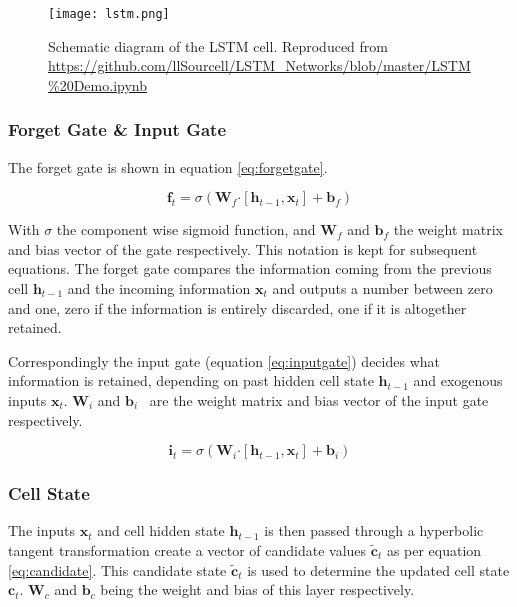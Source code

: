 \begin{figure}
	\noindent\texttt{[image: lstm.png]}
	\caption{Schematic diagram of the LSTM cell. Reproduced 
	from \url{https://github.com/llSourcell/LSTM_Networks/blob/master/LSTM\%20Demo.ipynb}}
	\label{fig:lstmcell}
\end{figure}

\subsubsection*{Forget Gate \& Input Gate}

The forget gate is shown in equation \ref{eq:forgetgate}. 

\begin{equation}\label{eq:forgetgate}
 \mathbf{f}_{t} = \sigma  \left( \mathbf{W}_f \boldsymbol{\cdot}  \left[ \mathbf{h}_{t-1}, \mathbf{x}_t \right] + 
 \mathbf{b}_f \right)
\end{equation}

\vspace{\baselineskip}

With  $\sigma$  the component wise sigmoid function, and  $\mathbf{W}_{f}$ and $\mathbf{b}_{f}$ the weight matrix 
and bias vector of the gate respectively. This notation is kept for subsequent equations. The forget gate compares 
the information coming from the previous cell $\mathbf{h}_{t-1}$ and the incoming information  $  \mathbf{x}_{t} $  and outputs a number 
between zero and one, zero if the information is entirely discarded, one if it is altogether retained.

Correspondingly the input gate (equation \ref{eq:inputgate}) decides what information is retained, depending 
on past hidden cell state $\mathbf{h}_{t-1}$ and exogenous inputs $\mathbf{x}_t$. $  \mathbf{W}_{i} $  and  
$  \mathbf{b}_{i} $ \ are the weight matrix and bias vector of the input gate respectively.

\begin{equation}\label{eq:inputgate}
 \mathbf{i}_{t} = \sigma  \left(\mathbf{W}_{i} \boldsymbol{\cdot} \left[ \mathbf{h}_{t-1}, \mathbf{x}_{t} \right] + 
 \mathbf{b}_{i} \right)
\end{equation}

\subsubsection*{Cell State}

The inputs $\mathbf{x}_t$ and cell hidden state $\mathbf{h}_{t-1}$ is then passed through a hyperbolic tangent 
transformation create a vector of candidate values $   \tilde{\mathbf{c}}_{t} $ as per equation \ref{eq:candidate}. 
This candidate state $\tilde{\mathbf{c}}_{t}$ is used to determine the updated cell state $\mathbf{c}_{t}$. 
$  \mathbf{W}_{c} $  and  $\mathbf{b}_{c} $  being the weight and bias of this layer respectively. 
 


